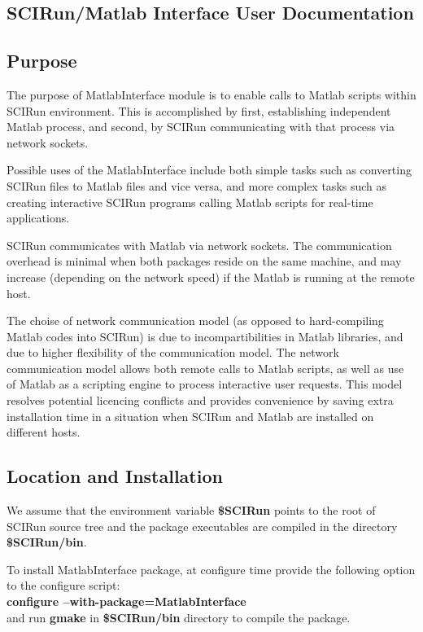 \documentclass[12pt]{IEEEtran}
\begin{document}
\baselineskip 0.3in

\begin{centering}
\section*{SCIRun/Matlab Interface User Documentation}
\end{centering}

\subsection*{Purpose} \indent

The purpose of MatlabInterface module is to enable calls to
Matlab scripts within SCIRun environment. This is accomplished 
by first, establishing independent Matlab process, and second,
by SCIRun communicating with that process via network sockets.

Possible uses of the MatlabInterface include both simple tasks
such as converting SCIRun files to Matlab files and vice versa,
and more complex tasks such as creating interactive SCIRun
programs calling Matlab scripts for real-time applications.

SCIRun communicates with Matlab via network sockets. The communication
overhead is minimal when both packages reside on the same machine, 
and may increase (depending on the network speed) if the Matlab is 
running at the remote host. 

The choise of network communication model (as opposed to hard-compiling 
Matlab codes into SCIRun) is due to incompartibilities in Matlab
libraries, and due to higher flexibility of the communication model. 
The network communication model allows both remote calls to Matlab 
scripts, as well as use of Matlab as a scripting engine to process 
interactive user requests. This model resolves potential licencing 
conflicts and provides convenience by saving extra installation time 
in a situation when SCIRun and Matlab are installed on different hosts.

\subsection*{Location and Installation} \indent

We assume that the
environment variable {\bf \$SCIRun} points to the root of SCIRun
source tree and the package executables are compiled in the
directory {\bf \$SCIRun/bin}.

To install MatlabInterface package, at configure time provide the
following option to the configure script: \\
{\bf configure --with-package=MatlabInterface} \\
and run {\bf gmake } in {\bf \$SCIRun/bin} directory
to compile the package. 
\end{document}
